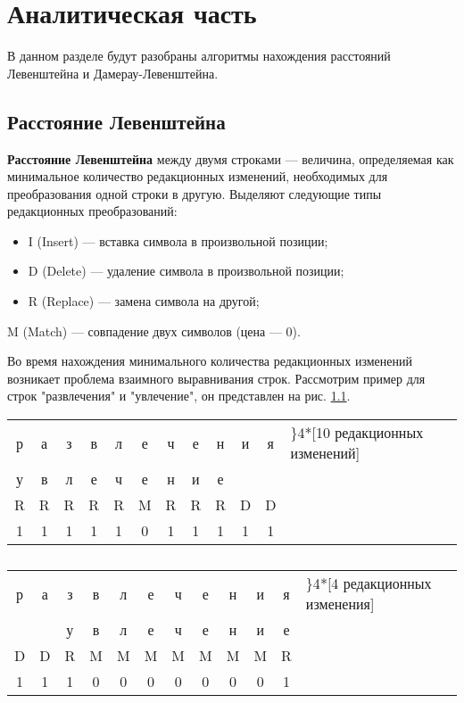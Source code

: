 \chapter{Аналитическая часть}

В данном разделе будут разобраны алгоритмы нахождения расстояний Левенштейна и Дамерау-Левенштейна.


\section{Расстояние Левенштейна}

\textbf{Расстояние Левенштейна} \cite{Levenshtein} между двумя строками --- величина, определяемая как минимальное количество редакционных изменений, необходимых для преобразования одной строки в другую. \newline
Выделяют следующие типы редакционных преобразований:
\begin{itemize}
	\item I (Insert) --- вставка символа в произвольной позиции;
	\item D (Delete) --- удаление символа в произвольной позиции;
	\item R (Replace) --- замена символа на другой;
\end{itemize}

	M (Match) --- совпадение двух символов (цена --- 0). \newline

Во время нахождения минимального количества редакционных изменений возникает проблема взаимного выравнивания строк. Рассмотрим пример для строк "развлечения" и "увлечение", он представлен на рис. \ref{table_1}.\newline
\pagebreak
\begin{table}[!h]
	\begin{tabular}{ c|c|c|c|c|c|c|c|c|c|cl }
		р & а & з & в & л & е & ч & е & н & и & я & \rdelim\}{4}{*}[10 редакционных изменений] \\
		у & в & л & е & ч & е & н & и & е & ~ & ~ \\
		R & R & R & R & R & M & R & R & R & D & D \\
		1 & 1 & 1 & 1 & 1 & 0 & 1 & 1 & 1 & 1 & 1 
	\end{tabular}
\end{table}
\begin{table}[!h]
	\begin{tabular}{ c|c|c|c|c|c|c|c|c|c|cl }
		р & а & з & в & л & е & ч & е & н & и & я & \rdelim\}{4}{*}[4 редакционных изменения]\\
		~ & ~ & у & в & л & е & ч & е & н & и & е \\
		D & D & R & M & M & M & M & M & M & M & R \\
		1 & 1 & 1 & 0 & 0 & 0 & 0 & 0 & 0 & 0 & 1 
	\end{tabular}
	\caption{}
	\label{table_1}
\end{table}

